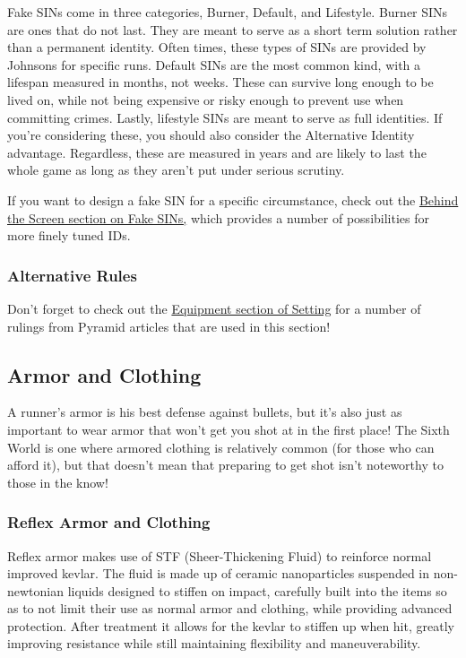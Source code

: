 Fake SINs come in three categories, Burner, Default, and Lifestyle. Burner SINs are ones that do not last. They are meant to serve as a short term solution rather than a permanent identity. Often times, these types of SINs are provided by Johnsons for specific runs. Default SINs are the most common kind, with a lifespan measured in months, not weeks. These can survive long enough to be lived on, while not being expensive or risky enough to prevent use when committing crimes. Lastly, lifestyle SINs are meant to serve as full identities. If you're considering these, you should also consider the Alternative Identity advantage. Regardless, these are measured in years and are likely to last the whole game as long as they aren't put under serious scrutiny.

If you want to design a fake SIN for a specific circumstance, check out the \hyperref[bts_fake_SIN]{Behind the Screen section on Fake SINs,} which provides a number of possibilities for more finely tuned IDs.

\subsubsection{Alternative Rules}

Don't forget to check out the \hyperref[setting_equipment]{Equipment section of Setting} for a number of rulings from Pyramid articles that are used in this section!

\subsection{Armor and Clothing}

A runner's armor is his best defense against bullets, but it's also just as important to wear armor that won't get you shot at in the first place! The Sixth World is one where armored clothing is relatively common (for those who can afford it), but that doesn't mean that preparing to get shot isn't noteworthy to those in the know!

\subsubsection{Reflex Armor and Clothing}

Reflex armor makes use of STF (Sheer-Thickening Fluid) to reinforce normal improved kevlar. The fluid is made up of ceramic nanoparticles suspended in non-newtonian liquids designed to stiffen on impact, carefully built into the items so as to not limit their use as normal armor and clothing, while providing advanced protection. After treatment it allows for the kevlar to stiffen up when hit, greatly improving resistance while still maintaining flexibility and maneuverability.

